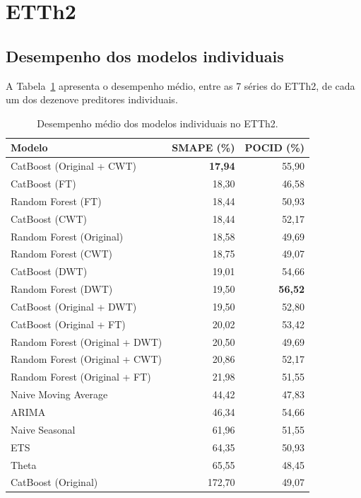 \section{ETTh2} \label{sec:resultados-etth2}

\subsection{Desempenho dos modelos individuais}

A Tabela~\ref{tab:etth2-individual} apresenta o desempenho médio, entre as 7 séries do ETTh2, de cada um dos dezenove preditores individuais.

\begin{table}[H]
\centering
\caption{Desempenho médio dos modelos individuais no ETTh2.}
\label{tab:etth2-individual}
\begin{tabular}{@{}lrr@{}}
\toprule
\textbf{Modelo} & \textbf{SMAPE (\%)} & \textbf{POCID (\%)} \\
\midrule
CatBoost (Original + CWT)            & \textbf{17,94} & 55,90 \\
CatBoost (FT)                        & 18,30 & 46,58 \\
Random Forest (FT)                   & 18,44 & 50,93 \\
CatBoost (CWT)                       & 18,44 & 52,17 \\
Random Forest (Original)             & 18,58 & 49,69 \\
Random Forest (CWT)                  & 18,75 & 49,07 \\
CatBoost (DWT)                       & 19,01 & 54,66 \\
Random Forest (DWT)                  & 19,50 & \textbf{56,52} \\
CatBoost (Original + DWT)            & 19,50 & 52,80 \\
CatBoost (Original + FT)             & 20,02 & 53,42 \\
Random Forest (Original + DWT)       & 20,50 & 49,69 \\
Random Forest (Original + CWT)       & 20,86 & 52,17 \\
Random Forest (Original + FT)        & 21,98 & 51,55 \\
Naive Moving Average                 & 44,42 & 47,83 \\
ARIMA                                & 46,34 & 54,66 \\
Naive Seasonal                       & 61,96 & 51,55 \\
ETS                                  & 64,35 & 50,93 \\
Theta                                & 65,55 & 48,45 \\
CatBoost (Original)                  & 172,70 & 49,07 \\
\bottomrule
\end{tabular}
\end{table}

